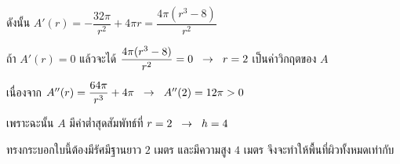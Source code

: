 \documentclass[hidelinks,12pt,a4paper]{article}
\newcommand{\s}{\space}
\begin{document}
\hspace{15mm} ดังนั้น \s $A'(r)=-\dfrac{32\pi}{r^2}+4\pi r = \dfrac{4\pi(r^3-8)}{r^2}$

\hspace{15mm} ถ้า $A'(r)=0$ \s แล้วจะได้ \s $\dfrac{4\pi(r^3-8)}{r^2}=0 \hspace{2mm} \rightarrow \hspace{2mm} r=2$ เป็นค่าวิกฤตของ $A$
\begin{comment}
\hspace{15mm} เส้นจำนวนแสดงเครื่องหมายของ $A'(r)$ เป็นดังนี้
\begin{center}
    \begin{tikzpicture}
        \begin{axis}[xlabel={$x$},
            height = 20mm,
            width=7cm,
            xtick={2},
            xmin=0,xmax=4,ymin=0,ymax=1.5,
            every axis plot/.append style={very thick},
            axis y line=none,
            axis x line=middle,
            axis line style={stealth-stealth},
            every axis x label/.style={at={(ticklabel* cs:1.0)},anchor=west},
            ]
            \node[] at (axis cs:1,0.8) {\color{orange}{$-$}};
            \node[] at (axis cs:3,0.8) {\color{orange}{$+$}};
        \end{axis}
    \end{tikzpicture}
\end{center}
\end{comment}

\hspace{15mm} เนื่องจาก \s $A''(r)=\dfrac{64\pi}{r^3}+4\pi \hspace{2mm} \rightarrow \hspace{2mm} A''(2)=12\pi>0$

\hspace{15mm} เพราะฉะนั้น $A$ มีค่าต่ำสุดสัมพัทธ์ที่ $r=2  \hspace{2mm} \rightarrow \hspace{2mm} h=4$

\hspace{15mm} ทรงกระบอกใบนี้ต้องมีรัศมีฐานยาว $2$ เมตร และมีความสูง $4$ เมตร จึงจะทำให้พื้นที่ผิวทั้งหมดเท่ากับ 
\end{document}
